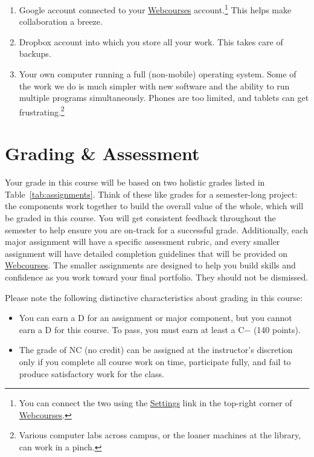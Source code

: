 \documentclass[11pt, twosides]{amsart}	%
\begin{document}
\begin{itemize}
\begin{enumerate}
		\item Google account connected to your \href{http://webcourses.instructure.com}{Webcourses} account.\footnote{You can connect the two using the \href{https://webcourses.ucf.edu/profile/settings}{Settings} link in the top-right corner of \href{http://webcourses.instructure.com}{Webcourses}.} This helps make collaboration a breeze.
		\item Dropbox account into which you store all your work. This takes care of backups.
		\item Your own computer running a full (non-mobile) operating system. Some of the work we do is much simpler with new software and the ability to run multiple programs simultaneously. Phones are too limited, and tablets can get frustrating.\footnote{Various computer labs across campus, or the loaner machines at the library, can work in a pinch.}
	\end{enumerate}
\end{itemize}

\section{Grading \& Assessment}
Your grade in this course will be based on two holistic grades listed in Table~\ref{tab:assignments}. Think of these like grades for a semester-long project: the components work together to build the overall value of the whole, which will be graded in this course. You will get consistent feedback throughout the semester to help ensure you are on-track for a successful grade. Additionally, each major assignment will have a specific assessment rubric, and every smaller assignment will have detailed completion guidelines that will be provided  on \href{https://webcourses2c.instructure.com/courses/985581}{Webcourses}.  The smaller assignments are designed to help you build skills and confidence as you work toward your final portfolio. They should not be dismissed.

Please note the following distinctive characteristics about grading in this course:
\begin{itemize}
	\item You can earn a D for an assignment or major component, but you cannot earn a D for this course. To pass, you must earn at least a C− (140 points).
	\item The grade of NC (no credit) can be assigned at the instructor’s discretion only if you complete all course work on time, participate fully, and fail to produce satisfactory work for the class.
\end{itemize}
\end{document}
